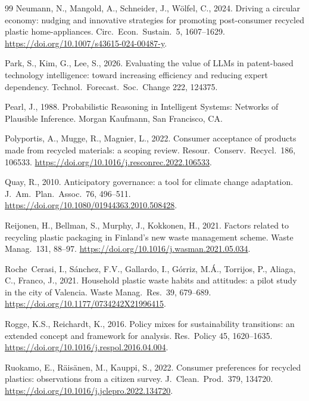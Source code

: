 \begin{thebibliography}{99}
Neumann, N., Mangold, A., Schneider, J., W\"olfel, C., 2024. Driving a circular economy: nudging
and innovative strategies for promoting post-consumer recycled plastic home-appliances.
Circ.\ Econ.\ Sustain.\ 5, 1607--1629. \url{https://doi.org/10.1007/s43615-024-00487-y}.

Park, S., Kim, G., Lee, S., 2026. Evaluating the value of LLMs in patent-based technology
intelligence: toward increasing efficiency and reducing expert dependency. Technol.\ Forecast.\
Soc.\ Change 222, 124375.

Pearl, J., 1988. Probabilistic Reasoning in Intelligent Systems: Networks of Plausible
Inference. Morgan Kaufmann, San Francisco, CA.

Polyportis, A., Mugge, R., Magnier, L., 2022. Consumer acceptance of products made from
recycled materials: a scoping review. Resour.\ Conserv.\ Recycl.\ 186, 106533.
\url{https://doi.org/10.1016/j.resconrec.2022.106533}.

Quay, R., 2010. Anticipatory governance: a tool for climate change adaptation.
J.\ Am.\ Plan.\ Assoc.\ 76, 496--511. \url{https://doi.org/10.1080/01944363.2010.508428}.

Reijonen, H., Bellman, S., Murphy, J., Kokkonen, H., 2021. Factors related to recycling plastic
packaging in Finland's new waste management scheme. Waste Manag.\ 131, 88--97.
\url{https://doi.org/10.1016/j.wasman.2021.05.034}.

Roche~Cerasi, I., S\'anchez, F.V., Gallardo, I., G\'orriz, M.\'A., Torrijos, P., Aliaga, C.,
Franco, J., 2021. Household plastic waste habits and attitudes: a pilot study in the city of
Valencia. Waste Manag.\ Res.\ 39, 679--689. \url{https://doi.org/10.1177/0734242X21996415}.

Rogge, K.S., Reichardt, K., 2016. Policy mixes for sustainability transitions: an extended
concept and framework for analysis. Res.\ Policy 45, 1620--1635.
\url{https://doi.org/10.1016/j.respol.2016.04.004}.

Ruokamo, E., R\"ais\"anen, M., Kauppi, S., 2022. Consumer preferences for recycled plastics:
observations from a citizen survey. J.\ Clean.\ Prod.\ 379, 134720.
\url{https://doi.org/10.1016/j.jclepro.2022.134720}.


\end{thebibliography}
